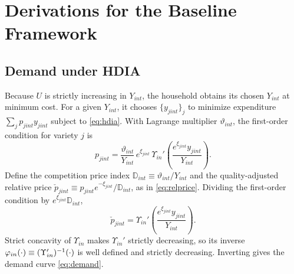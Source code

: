 
\newpage

\appendix

\renewcommand{\theequation}{\thesection\arabic{equation}}
\renewcommand{\theHequation}{\thesection\arabic{equation}}%

\let\oldsection\section
\renewcommand{\section}{\clearpage\oldsection}



\section{Derivations for the Baseline Framework}\label{sec:app-baseline}

\subsection{Demand under HDIA}\label{sec:app-demand}

Because $U$ is strictly increasing in $Y_{int}$, the household obtains its chosen $Y_{int}$ at minimum cost.
For a given $Y_{int}$, it chooses $\{y_{jint}\}_{j}$ to minimize expenditure $\sum_{j} p_{jint} y_{jint}$ subject to \eqref{eq:hdia}.
With Lagrange multiplier $\vartheta_{int}$, the first-order condition for variety $j$ is
\begin{equation*}
	p_{jint} = \frac{\vartheta_{int}}{Y_{int}} \, e^{\xi_{jint}} \, \Upsilon_{in}'\left(\frac{e^{\xi_{jint}} y_{jint}}{Y_{int}}\right).
\end{equation*}
Define the competition price index $\mathbb{D}_{int} \equiv \vartheta_{int}/Y_{int}$ and the quality-adjusted relative price $\check{p}_{jint} \equiv p_{jint} e^{-\xi_{jint}}/\mathbb{D}_{int}$, as in \eqref{eq:relprice}.
Dividing the first-order condition by $e^{\xi_{jint}}\mathbb{D}_{int}$,
\begin{equation*}
	\check{p}_{jint} = \Upsilon_{in}'\left(\frac{e^{\xi_{jint}} y_{jint}}{Y_{int}}\right).
\end{equation*}
Strict concavity of $\Upsilon_{in}$ makes $\Upsilon_{in}'$ strictly decreasing, so its inverse $\varphi_{in}(\cdot) \equiv (\Upsilon_{in}')^{-1}(\cdot)$ is well defined and strictly decreasing.
Inverting gives the demand curve \eqref{eq:demand}.

